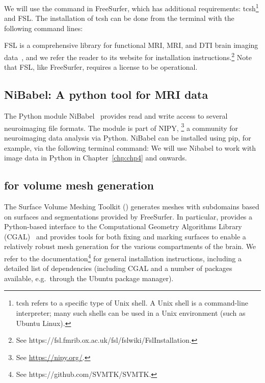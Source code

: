 We will use the command  in FreeSurfer, which has
additional requirements: tcsh\footnote{tcsh refers to a specific type
  of Unix shell. A Unix shell is a command-line interpreter; many such
  shells can be used in a Unix environment (such as Ubuntu Linux).}
and FSL. The installation of tcsh can be done from the terminal with
the following command lines: 

FSL is a comprehensive library for functional MRI, MRI, and DTI brain
imaging data~\cite{jenkinson2012fsl}, and we refer the reader to its
website for installation instructions.\footnote{See
  https://fsl.fmrib.ox.ac.uk/fsl/fslwiki/FslInstallation.} Note that
FSL, like FreeSurfer, requires a license to be operational.

\subsection{NiBabel: A python tool for MRI data}
\label{sec:chp2:tools:nibabel-numpy}

The Python module NiBabel~\cite{brett_matthew_2020_4295521} provides read and write
access to several neuroimaging file formats. The module is part of
NIPY, \footnote{See \url{https://nipy.org/}.} a community for neuroimaging
data analysis via Python. NiBabel can be installed using pip, for example, via the  
following terminal command:
\noindent We will use Nibabel to work with image data in Python in 
Chapter~\ref{chp:chp4} and onwards.

\subsection{\svmtk{} for volume mesh generation}
\label{sec:chp2:tools:meshing:svmtk}

The Surface Volume Meshing Toolkit (\svmtk{}) generates meshes with
subdomains based on surfaces and segmentations provided by
FreeSurfer. In particular, \svmtk{} provides a Python-based interface
to the Computational Geometry Algorithms Library
(CGAL)~\cite{fabri2000design} and provides tools for both fixing and
marking surfaces to enable a relatively robust mesh generation for the
various compartments of the brain. We refer to the \svmtk{}
documentation\footnote{See https://github.com/SVMTK/SVMTK.} for
general installation instructions, including a detailed list of
dependencies (including CGAL and a number of packages available,
e.g.~through the Ubuntu package manager).

